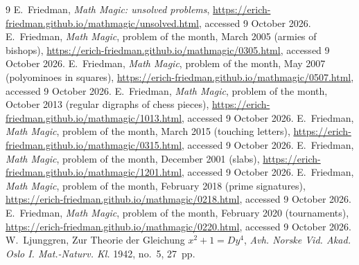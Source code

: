 \documentclass[11pt]{amsart}
\theoremstyle{remark}
\begin{document}
\begin{thebibliography}{9}
 E.~Friedman, \emph{Math Magic: unsolved problems},
\url{https://erich-friedman.github.io/mathmagic/unsolved.html}, accessed 9 October 2026.
 E.~Friedman, \emph{Math Magic}, problem of the month, March 2005 (armies of bishops),
\url{https://erich-friedman.github.io/mathmagic/0305.html}, accessed 9 October 2026.
 E.~Friedman, \emph{Math Magic}, problem of the month, May 2007 (polyominoes in
squares), \url{https://erich-friedman.github.io/mathmagic/0507.html}, accessed 9 October 2026.
 E.~Friedman, \emph{Math Magic}, problem of the month, October 2013 (regular
digraphs of chess pieces), \url{https://erich-friedman.github.io/mathmagic/1013.html}, accessed
9 October 2026.
 E.~Friedman, \emph{Math Magic}, problem of the month, March 2015 (touching letters),
\url{https://erich-friedman.github.io/mathmagic/0315.html}, accessed 9 October 2026.
 E.~Friedman, \emph{Math Magic}, problem of the month, December 2001 (slabs),
\url{https://erich-friedman.github.io/mathmagic/1201.html}, accessed 9 October 2026.
 E.~Friedman, \emph{Math Magic}, problem of the month, February 2018 (prime
signatures), \url{https://erich-friedman.github.io/mathmagic/0218.html}, accessed 9 October 2026.
 E.~Friedman, \emph{Math Magic}, problem of the month, February 2020 (tournaments),
\url{https://erich-friedman.github.io/mathmagic/0220.html}, accessed 9 October 2026.
 W.~Ljunggren, Zur Theorie der Gleichung $x^2+1=Dy^4$, \emph{Avh. Norske Vid. Akad.
Oslo I. Mat.-Naturv. Kl.} 1942, no.~5, 27~pp.
\end{thebibliography}
\end{document}
